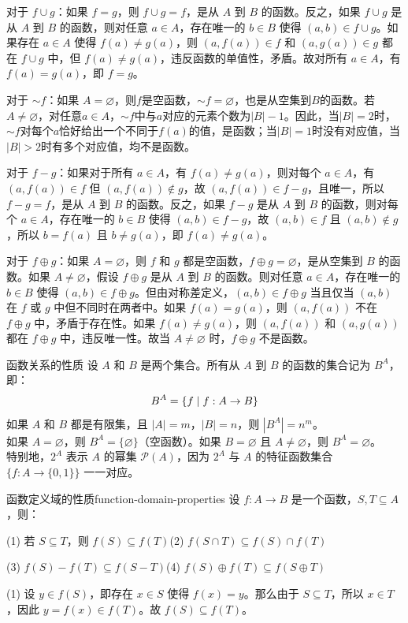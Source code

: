对于 $f \cup g$：如果 $f = g$，则 $f \cup g = f$，是从 $A$ 到 $B$ 的函数。反之，如果 $f \cup g$ 是从 $A$ 到 $B$ 的函数，则对任意 $a \in A$，存在唯一的 $b \in B$ 使得 $(a, b) \in f \cup g$。如果存在 $a \in A$ 使得 $f(a) \neq g(a)$，则 $(a, f(a)) \in f$ 和 $(a, g(a)) \in g$ 都在 $f \cup g$ 中，但 $f(a) \neq g(a)$，违反函数的单值性，矛盾。故对所有 $a \in A$，有 $f(a) = g(a)$，即 $f = g$。

对于 $\sim f$：如果 $A = \varnothing$，则$f$是空函数，$\sim f=\varnothing$，也是从空集到$B$的函数。若$A\neq\varnothing$，对任意$a\in A$，$\sim f$中与$a$对应的元素个数为$|B|-1$。因此，当$|B|=2$时，$\sim f$对每个$a$恰好给出一个不同于$f(a)$的值，是函数；当$|B|=1$时没有对应值，当$|B|>2$时有多个对应值，均不是函数。

对于 $f - g$：如果对于所有 $a \in A$，有 $f(a) \neq g(a)$，则对每个 $a \in A$，有 $(a, f(a)) \in f$ 但 $(a, f(a)) \notin g$，故 $(a, f(a)) \in f - g$，且唯一，所以 $f - g = f$，是从 $A$ 到 $B$ 的函数。反之，如果 $f - g$ 是从 $A$ 到 $B$ 的函数，则对每个 $a \in A$，存在唯一的 $b \in B$ 使得 $(a, b) \in f - g$，故 $(a, b) \in f$ 且 $(a, b) \notin g$，所以 $b = f(a)$ 且 $b \neq g(a)$，即 $f(a) \neq g(a)$。

对于 $f \oplus g$：如果 $A = \varnothing$，则 $f$ 和 $g$ 都是空函数，$f \oplus g = \varnothing$，是从空集到 $B$ 的函数。如果 $A \neq \varnothing$，假设 $f \oplus g$ 是从 $A$ 到 $B$ 的函数。则对任意 $a \in A$，存在唯一的 $b \in B$ 使得 $(a, b) \in f \oplus g$。但由对称差定义，$(a, b) \in f \oplus g$ 当且仅当 $(a, b)$ 在 $f$ 或 $g$ 中但不同时在两者中。如果 $f(a) = g(a)$，则 $(a, f(a))$ 不在 $f \oplus g$ 中，矛盾于存在性。如果 $f(a) \neq g(a)$，则 $(a, f(a))$ 和 $(a, g(a))$ 都在 $f \oplus g$ 中，违反唯一性。故当 $A \neq \varnothing$ 时，$f \oplus g$ 不是函数。

\begin{theorem}{函数关系的性质}{}
设 $A$ 和 $B$ 是两个集合。所有从 $A$ 到 $B$ 的函数的集合记为 $B^A$，即：\vspace{-5pt}
\[
B^A = \{f \mid f: A \to B\}\vspace{-5pt}
\]
如果 $A$ 和 $B$ 都是有限集，且 $|A| = m$，$|B| = n$，则 $|B^A| = n^m$。\\
如果 $A = \varnothing$，则 $B^A = \{\varnothing\}$（空函数）。如果 $B = \varnothing$ 且 $A \neq \varnothing$，则 $B^A = \varnothing$。\\
特别地，$2^A$ 表示 $A$ 的幂集 $\mathcal{P}(A)$，因为 $2^A$ 与 $A$ 的特征函数集合 $\{f: A \to \{0,1\}\}$ 一一对应。
\end{theorem}
\begin{theorem}{函数定义域的性质}{function-domain-properties}
设 $f: A \to B$ 是一个函数，$S, T \subseteq A$，则：

(1) 若 $S \subseteq T$，则 $f(S) \subseteq f(T)$\quad (2) $f(S \cap T) \subseteq f(S) \cap f(T)$

(3) $f(S) - f(T) \subseteq f(S - T)$\quad (4) $f(S) \oplus f(T) \subseteq f(S \oplus T)$
\end{theorem}
(1) 设 $y \in f(S)$，即存在 $x \in S$ 使得 $f(x) = y$。那么由于 $S \subseteq T$，所以 $x \in T$，因此 $y = f(x) \in f(T)$。故 $f(S) \subseteq f(T)$。

